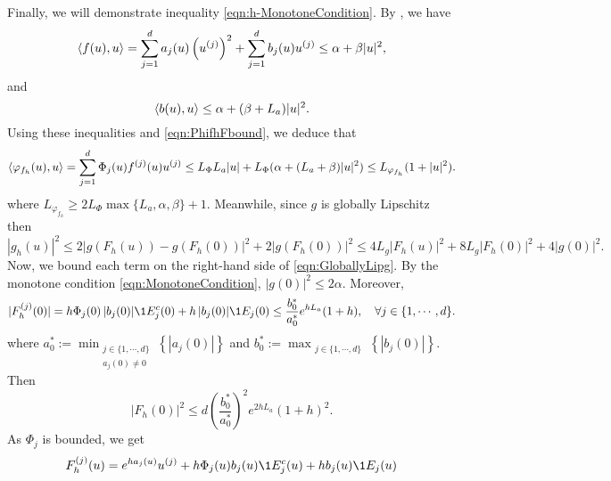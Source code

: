 \begin{pf}
	Finally, we  will demonstrate inequality \eqref{eqn:h-MonotoneCondition}. 
	By , we have
	\begin{equation*}\label{eqn:bDotProdBound}
			\left\langle f(u), u\right\rangle
			=
			\sum_{j=1}^d
				a_j(u) \left( u^{(j)} \right)^2
			+
			\sum_{j=1}^d
			b_j(u) u^{(j)}
			\leq \alpha +\beta |u|^2,
	\end{equation*}
	and
		\begin{equation*}\label{eqn:bDotProdBound}
			\left\langle b(u), u\right\rangle \leq \alpha + (\beta + L_a)|u|^2.
		\end{equation*}
	Using these inequalities and \eqref{eqn:PhifhFbound}, we deduce that
	\begin{equation}\label{eqn:VarphifhDotProdBound}
			\left\langle\varphi_{f_h}(u), u\right\rangle 
				=\sum_{j=1}^d
						\Phi_j(u) f^{(j)}(u) u^{(j)}
				\leq L_{\Phi} L_a|u| +  L_{\Phi}(\alpha + (L_a + \beta)|u|^2) \leq
				L_{\varphi_{f_h}} (1+|u|^2).					
		\end{equation}
	where
	$
		L_{\varphi_{f_h}}\geq 2 L_{\Phi}\max\{L_a, \alpha, \beta\} + 1.
	$ 
	Meanwhile, since $g$ is globally Lipschitz then
	\begin{equation}\label{eqn:GloballyLipg}
		|g_h(u)|^2 
		\leq
			2 |g(F_h(u)) - g(F_h(0))|^2  + 2 | g(F_h(0))|^2 \leq
			4 L_g |F_h(u)|^2  + 8 L_g |F_h(0)|^2  + 4 |g(0)|^2 .
	\end{equation}
	Now, we bound each term on the right-hand side of  \eqref{eqn:GloballyLipg}.
	By the monotone condition \eqref{eqn:MonotoneCondition}, $|g(0)|^2 \leq 2\alpha$.
	Moreover,
	\begin{equation*}
		|F_h^{(j)} (0) |=
			h\Phi_j(0)\,| b_j(0)| \1{E_j^c}(0) + 
			h\,|b_j(0)| \1{E_j}(0)
			\leq
			\frac{b_0^*}{a_0^*}
			e^{h L_a} (1+h),
			\quad
			\forall j \in \{1, \cdots, d\}.
	\end{equation*}
	where
	$a^*_0 := 
			\min_{
				\substack{
					j \in \{1, \cdots, d \}\\
					a_j(0) \neq 0
				}
			}
			\left\{
				|a_j(0)|
			\right\}$
 and 
		$b^*_0 :=
			\max_{\substack{
				j\in \{1,\cdots, d\}}
			}
			\left\{
				|b_j(0)|
			\right\}.$
	Then
	\begin{equation} \label{eqn:BoundFhZero}
		|F_h(0)|^2 
			\leq
			d\left(
				\frac{b_0^*}{a_0^*}
			\right)^2
		e^{2h L_a} (1+h)^2.
	\end{equation}
	As $\Phi_j$ is bounded, we get
	\begin{dmath*}
		F_h^{(j)}(u) 
			=
			e^{h a_j(u)} u^{(j)} +
			h \Phi_j(u) b_j(u) \1{E_j^c}(u) +h b_j(u) \1{E_j}(u)

\end{dmath*}
\end{pf}

